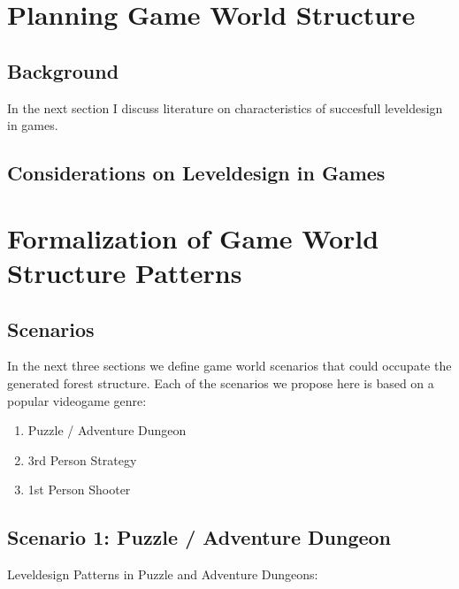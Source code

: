 
\chapter{Planning Game World Structure}
\label{sec:treehousearch}
 
  
\section{Background}

%
%


In the next section I discuss literature on characteristics of succesfull leveldesign in games.  

\section{Considerations on Leveldesign in Games}

% 
%
%
%
%

\chapter{Formalization of Game World Structure Patterns}
\label{sec:scenarios}


\section{Scenarios} 
In the next three sections we define game world scenarios that could occupate the generated forest structure. Each of the scenarios we propose here is based on a popular videogame genre: 

\begin{enumerate}
\item Puzzle / Adventure Dungeon
\item 3rd Person Strategy 
\item 1st Person Shooter
\end{enumerate} 


\section{Scenario 1: Puzzle / Adventure Dungeon}
Leveldesign Patterns in Puzzle and Adventure Dungeons:

